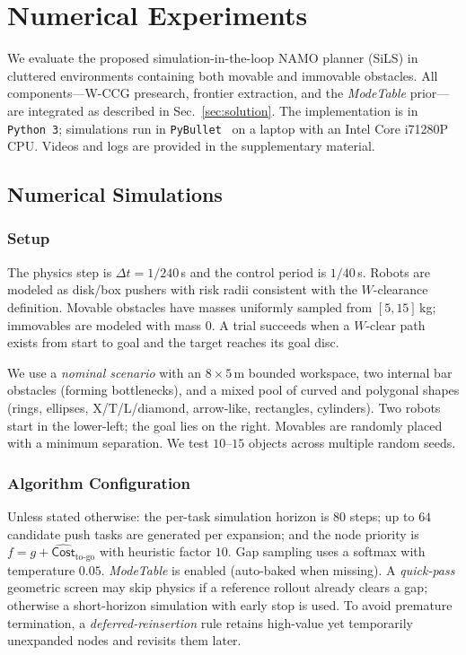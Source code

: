 \section{Numerical Experiments}
\label{sec:experiments}
We evaluate the proposed simulation-in-the-loop NAMO planner (SiLS) in cluttered environments containing both movable and immovable obstacles. All components—W-CCG presearch, frontier extraction, and the \textit{ModeTable} prior—are integrated as described in Sec.~\ref{sec:solution}. The implementation is in \texttt{Python~3}; simulations run in \texttt{PyBullet}~\cite{coumans2019} on a laptop with an Intel Core i7\textendash1280P CPU. Videos and logs are provided in the supplementary material.

\subsection{Numerical Simulations}
\label{subsec:sim}

\subsubsection{Setup}
\label{subsec:sim-setup}
The physics step is $\Delta t=1/240$\,s and the control period is $1/40$\,s. Robots are modeled as disk/box pushers with risk radii consistent with the $W$-clearance definition. Movable obstacles have masses uniformly sampled from $[5,15]$\,kg; immovables are modeled with mass $0$. A trial succeeds when a $W$-clear path exists from start to goal and the target reaches its goal disc.

We use a \emph{nominal scenario} with an $8{\times}5$\,m bounded workspace, two internal bar obstacles (forming bottlenecks), and a mixed pool of curved and polygonal shapes (rings, ellipses, X/T/L/diamond, arrow-like, rectangles, cylinders). Two robots start in the lower-left; the goal lies on the right. Movables are randomly placed with a minimum separation. We test $10\text{--}15$ objects across multiple random seeds.

\subsubsection{Algorithm Configuration}
\label{subsec:algo-config}
Unless stated otherwise: the per-task simulation horizon is $80$ steps; up to $64$ candidate push tasks are generated per expansion; and the node priority is $f=g+\widehat{\mathsf{Cost}}_{\text{to-go}}$ with heuristic factor $10$. Gap sampling uses a softmax with temperature $0.05$. \textit{ModeTable} is enabled (auto-baked when missing). A \emph{quick-pass} geometric screen may skip physics if a reference rollout already clears a gap; otherwise a short-horizon simulation with early stop is used. To avoid premature termination, a \emph{deferred-reinsertion} rule retains high-value yet temporarily unexpanded nodes and revisits them later.

